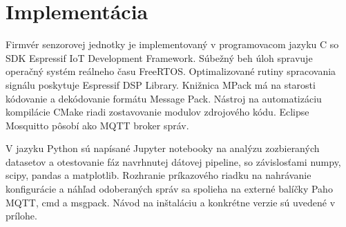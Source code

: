 \chapter{Implementácia}
Firmvér senzorovej jednotky je implementovaný v programovacom jazyku C so
SDK Espressif IoT Development Framework. Súbežný beh úloh spravuje operačný systém reálneho času FreeRTOS.
Optimalizované rutiny spracovania signálu poskytuje Espressif DSP Library. Knižnica MPack má na starosti
kódovanie a dekódovanie formátu Message Pack. Nástroj na automatizáciu kompilácie CMake riadi zostavovanie
modulov zdrojového kódu. Eclipse Mosquitto pôsobí ako MQTT broker správ.

V jazyku Python sú napísané Jupyter notebooky na analýzu zozbieraných datasetov a otestovanie fáz navrhnutej dátovej pipeline,
so závislosťami numpy, scipy, pandas a matplotlib. Rozhranie príkazového riadku na nahrávanie konfigurácie a náhľad odoberaných
správ sa spolieha na externé balíčky Paho MQTT, cmd a msgpack. Návod na inštaláciu a konkrétne verzie sú uvedené v prílohe.

